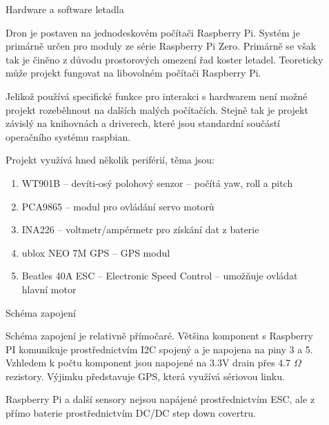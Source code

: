 \documentclass[final]{beamer}
\newlength{\sepwidth}
\newlength{\colwidth}
\newcommand{\separatorcolumn}{\begin{column}{\sepwidth}\end{column}}
\begin{document}
\begin{frame}[t]
\begin{columns}[t]
\begin{column}{\colwidth}
    \end{column}

    \separatorcolumn

    \begin{column}{\colwidth}

      \begin{block}{Hardware a software letadla}

				Dron je postaven na jednodeskovém počítači Raspberry Pi.
				Systém je primárně určen pro moduly ze série Raspberry Pi Zero.
				Primárně se však tak je činěno z důvodu prostorových omezení řad koster letadel.
				Teoreticky může projekt fungovat na libovolném počítači Raspberry Pi.

				Jelikož používá specifické funkce pro interakci s hardwarem není možné projekt rozeběhnout na dalších malých počítačích.
				Stejně tak je projekt závislý na knihovnách a driverech, které jsou standardní součástí operačního systému raspbian.

				Projekt využívá hned několik periférií, těma jsou:

        \begin{enumerate}
          \item WT901B -- devíti-osý polohový senzor -- počítá yaw, roll a pitch
          \item PCA9865 -- modul pro ovládání servo motorů
          \item INA226 -- voltmetr/ampérmetr pro získání dat z baterie
					\item ublox NEO 7M GPS -- GPS modul
					\item Beatles 40A ESC -- Electronic Speed Control -- umožňuje ovládat hlavní motor
        \end{enumerate}

      \end{block}

      \begin{block}{Schéma zapojení}

				Schéma zapojení je relativně přímočaré.
				Většina komponent s Raspberry PI komunikuje prostřednictvím I2C spojený a je napojena na piny 3 a 5.
				Vzhledem k počtu komponent jsou napojené na 3.3V drain přes 4.7 $\Omega$ rezistory.
				Výjimku představuje GPS, která využívá sériovou linku.

				Raspberry Pi a další sensory nejsou napájené prostřednictvím ESC, ale z přímo baterie prostřednictvím DC/DC step down covertru.


\end{block}
\end{column}
\end{columns}
\end{frame}
\end{document}
